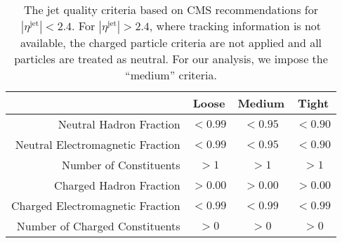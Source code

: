 \documentclass[aps,prd,twocolumn,preprintnumbers,nofootinbib,longbibliography,floatfix,superscriptaddress]{revtex4-1}
\begin{document}
\begin{table}
\begin{center}
\begin{tabular}{ r c c c }
\hline
\hline
& Loose & Medium & Tight\\
\hline
\hline
Neutral Hadron Fraction & $<0.99$ & $<0.95$ & $<0.90$ \\
Neutral Electromagnetic Fraction & $<0.99$ & $<0.95$ & $<0.90$ \\
Number of Constituents & $>1$ & $>1$ & $>1$ \\ \hline
Charged Hadron Fraction & $>0.00$ & $>0.00$ & $>0.00$ \\
Charged Electromagnetic Fraction & $<0.99$ & $<0.99$ & $<0.99$ \\
Number of Charged Constituents & $>0$ & $>0$ & $>0$ \\
\hline
\hline
\end{tabular}
\caption{The jet quality criteria based on CMS recommendations for $|\eta^\text{jet}|<2.4$. For $|\eta^\text{jet}|>2.4$, where tracking information is not available, the charged particle criteria are not applied and all particles are treated as neutral.
%
For our analysis, we impose the ``medium'' criteria.
}
\label{table:jqc}
\end{center}
\end{table}
\end{document}
